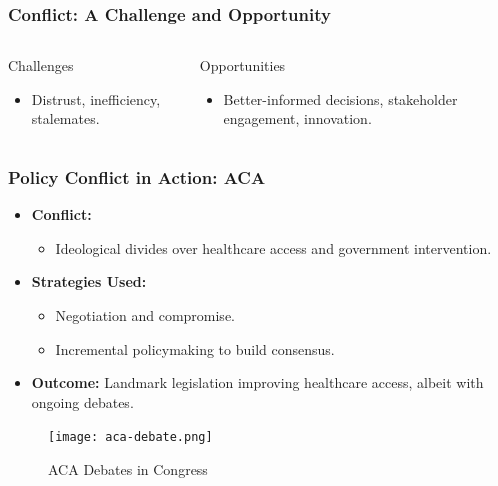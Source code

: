 \documentclass[10pt]{beamer}
\begin{document}
\begin{frame}
        \begin{frame}
        \frametitle{Conflict: A Challenge and Opportunity}
        \begin{columns}[T,onlytextwidth]
            \begin{block}{Challenges}
                \begin{itemize}
                    \item Distrust, inefficiency, stalemates.
                \end{itemize}
            \end{block}
            \begin{block}{Opportunities}
                \begin{itemize}
                    \item Better-informed decisions, stakeholder engagement, innovation.
                \end{itemize}
            \end{block}
        \end{columns}
        \end{frame}
        
        \begin{frame}
        \frametitle{Policy Conflict in Action: ACA}
        \begin{itemize}
            \item \textbf{Conflict:}
                \begin{itemize}
                    \item Ideological divides over healthcare access and government intervention.
                \end{itemize}
            \item \textbf{Strategies Used:}
                \begin{itemize}
                    \item Negotiation and compromise.
                    \item Incremental policymaking to build consensus.
                \end{itemize}
            \item \textbf{Outcome:} Landmark legislation improving healthcare access, albeit with ongoing debates.
        \end{itemize}
        
        \begin{figure}
            \centering
            \texttt{[image: aca-debate.png]}
            \caption{ACA Debates in Congress}
        \end{figure}
        \end{frame}
        

\end{frame}
\end{document}
